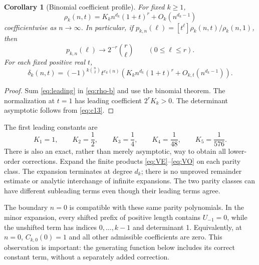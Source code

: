 \documentclass[11pt,letterpaper]{article}
\numberwithin{equation}{section}
\newtheorem{corollary}[theorem]{Corollary}
\theoremstyle{definition}
\begin{document}
\begin{corollary}[Binomial coefficient profile]\label{cor:asymptotic}
For fixed \(k\ge1\),
\begin{equation}\label{eq:rhoasymp}
 \rho_k(n,t)=K_k n^{d_k}(1+t)^r+O_k(n^{d_k-1})
\end{equation}
coefficientwise as \(n\to\infty\). In particular, if
\(p_{k,n}(\ell)=[t^\ell]\rho_k(n,t)/\rho_k(n,1)\), then
\[
 p_{k,n}(\ell)\longrightarrow 2^{-r}\binom r\ell
 \qquad(0\le\ell\le r).
\]
For each fixed positive real \(t\),
\begin{equation}\label{eq:deltaasymp}
 \delta_k(n,t)=(-1)^{k\binom n2}t^{e_k(n)}
 \left(K_kn^{d_k}(1+t)^r+O_{k,t}(n^{d_k-1})\right).
\end{equation}
\end{corollary}
\begin{proof}
Sum \eqref{eq:leading} in \eqref{eq:rho-b} and use the binomial theorem.
The normalization at \(t=1\) has leading coefficient \(2^rK_k>0\).
The determinant asymptotic follows from \eqref{eq:c13}.
\end{proof}
The first leading constants are
\[
 K_1=1,\qquad K_2=\frac12,\qquad K_3=\frac14,
 \qquad K_4=\frac1{48},\qquad K_5=\frac1{576}.
\]
There is also an exact, rather than merely asymptotic, way to obtain
all lower-order corrections. Expand the finite products
\eqref{eq:VE}--\eqref{eq:VO} on each parity class. The expansion
terminates at degree \(d_k\); there is no unproved remainder estimate
or analytic interchange of infinite expansions. The two parity classes
can have different subleading terms even though their leading terms agree.

The boundary \(n=0\) is compatible with these same parity polynomials.
In the minor expansion, every shifted prefix of positive length contains
\(U_{-1}=0\), while the unshifted term has indices \(0,\ldots,k-1\)
and determinant 1. Equivalently, at \(n=0\),
\(C_{k,0}(0)=1\) and all other admissible coefficients are zero.
This observation is important: the generating function below includes
its correct constant term, without a separately added correction.
\end{document}
